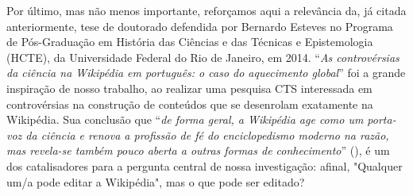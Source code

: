 Por último, mas não menos importante, reforçamos aqui a relevância da, já citada anteriormente, tese de doutorado defendida por Bernardo Esteves no Programa de Pós-Graduação em História das Ciências e das Técnicas e Epistemologia (HCTE), da Universidade Federal do Rio de Janeiro, em 2014. ``\textit{As controvérsias da ciência na Wikipédia em português: o caso do aquecimento global}'' foi a grande inspiração de nosso trabalho, ao realizar uma pesquisa CTS interessada em controvérsias na construção de conteúdos que se desenrolam exatamente na Wikipédia. Sua conclusão que ``\textit{de forma geral, a Wikipédia age como um porta-voz da ciência e renova a profissão de fé do enciclopedismo moderno na razão, mas revela-se também pouco aberta a outras formas de conhecimento}'' (\cite{esteves_as_2014}), é um dos catalisadores para a pergunta central de nossa investigação: afinal, "Qualquer um/a pode editar a Wikipédia", mas o que pode ser editado?